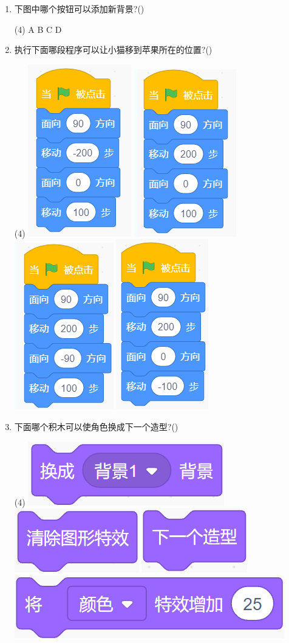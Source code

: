 \documentclass[10pt, a4paper]{article}
\begin{document}
\begin{enumerate}
       \item 下图中哪个按钮可以添加新背景?(\qquad)
       \begin{tasks}(4)
           \task A
           \task B
           \task C
           \task D
       \end{tasks}

        \item 执行下面哪段程序可以让小猫移到苹果所在的位置?(\qquad)
        \begin{tasks}(4)
            \task \includegraphics[width=.1\textwidth]{11a.png}
            \task \includegraphics[width=.1\textwidth]{11b.png}
            \task \includegraphics[width=.1\textwidth]{11c.png}
            \task \includegraphics[width=.1\textwidth]{11d.png}
        \end{tasks}
        
        \item 下面哪个积木可以使角色换成下一个造型?(\qquad)
        \begin{tasks}(4)
            \task \includegraphics[width=.13\textwidth]{12a.png}
            \task \includegraphics[width=.09\textwidth]{12b.png}
            \task \includegraphics[width=.08\textwidth]{12c.png}
            \task \includegraphics[width=.18\textwidth]{12d.png}
        \end{tasks}


\end{enumerate}
\end{document}
